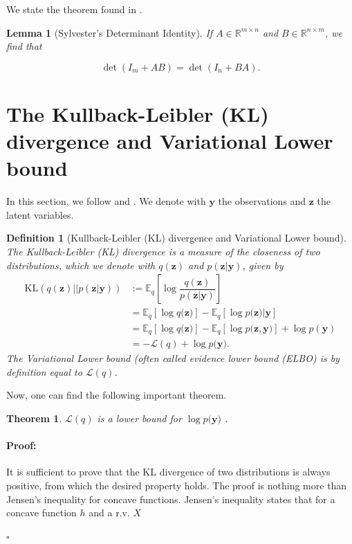 \documentclass[12pt,a4paper,oneside]{book}
\newtheorem{Definition}{Definition}
\newtheorem{Lemma}{Lemma}
\newtheorem{Theorem}{Theorem}
\newenvironment{proof}{\paragraph{Proof:}}{\hfill$\square$}
\begin{document}
{We state the theorem found in \cite{ambikasaran2014fast}.

\begin{Lemma}[Sylvester's Determinant Identity]
If $A \in \mathbb{R}^{m \times n}$ and $B \in \mathbb{R}^{n \times m}$, we find that

\begin{equation}
\det{(I_m + A B)} = \det{(I_n + B A)}.
\end{equation} 

\end{Lemma} 

\section{The Kullback-Leibler (KL) divergence and Variational Lower bound} \label{KL}

In this section, we follow \cite{blei2017variational} and \cite{yang2017understanding}. We denote with $\bm{y}$ the observations and $\bm{z}$ the latent variables. 

\begin{Definition}[Kullback-Leibler (KL) divergence and Variational Lower bound]
The Kullback-Leibler (KL) divergence is a measure of the closeness of two distributions, which we denote with $q(\bm{z})$ and $p(\bm{z}|\bm{y})$, given by
\begin{align}
\text{KL}(q(\bm{z})||p(\bm{z}|\bm{y})) &:= \mathbb{E}_q \left[ \log \dfrac{q(\bm{z})}{p(\bm{z}|\bm{y})} \right]
\nonumber \\ &= \mathbb{E}_q[\log{q(\bm{z}})] - \mathbb{E}_q[\log{p(\bm{z}})|\bm{y}] \nonumber \\
&= \mathbb{E}_q[\log{q(\bm{z}})] - \mathbb{E}_q[\log{p(\bm{z}},\bm{y})] + \log{p(\bm{y})} \nonumber \\
&= -\mathcal{L}(q) + \log{p(\bm{y}}).
\end{align}
The Variational Lower bound (often called evidence lower bound (ELBO) is by definition equal to $\mathcal{L}(q)$. 
\end{Definition}

Now, one can find the following important theorem. 

\begin{Theorem}
$\mathcal{L}(q)$ is a lower bound for $\log{p(\bm{y}})$ .
\end{Theorem}

\begin{proof}
It is sufficient to prove that the KL divergence of two distributions is always positive, from which the desired property holds. The proof is nothing more than Jensen's inequality for concave functions. Jensen's inequality states that for a concave function $h$ and a r.v. $X$


\end{proof}}
\end{document}
